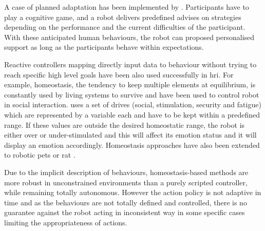 	
	A case of planned adaptation has been implemented by \citet{leyzberg2014personalizing}. Participants have to play a cognitive game,  and a robot delivers predefined advises on strategies depending on the performance and the current difficulties of the participant. With these anticipated human behaviours, the robot can proposed personalised support as long as the participants behave within expectations. 

	
	Reactive controllers mapping directly input data to behaviour without trying to reach specific high level goals have been also used successfully in \gls{hri}. For example, homeostasis, the tendency to keep multiple elements at equilibrium, is constantly used by living systems to survive and have been used to control robot in social interaction. \citet{breazeal1998motivational} uses a set of drives (social, stimulation, security and fatigue) which are represented by a variable each and have to be kept within a predefined range. If these values are outside the desired homeostatic range, the robot is either over or under-stimulated and this will affect its emotion status and it will display an emotion accordingly. Homeostasis approaches have also been extended to robotic pets \citep{arkin2003ethological} or \gls{rat} \citep{cao2017collaborative}.

	Due to the implicit description of behaviours, homeostasis-based methods are more robust in unconstrained environments than a purely scripted controller, while remaining totally autonomous. However the action policy is not adaptive in time and as the behaviours are not totally defined and controlled, there is no guarantee against the robot acting in inconsistent way in some specific cases limiting the appropriateness of actions.

	
